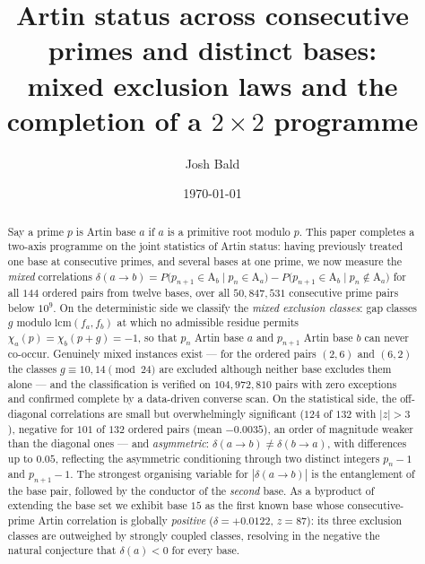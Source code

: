 \documentclass[11pt,reqno]{amsart}
\theoremstyle{plain}
\theoremstyle{definition}
\newcommand{\Art}{\mathrm{A}}
\begin{document}
\title[Mixed correlations of Artin primes]
{Artin status across consecutive primes and distinct bases:\\
mixed exclusion laws and the completion of a $2 \times 2$ programme}

\author{Josh Bald}
\address{Ontario, Canada}


\date{\today}

\begin{abstract}
Say a prime $p$ is Artin base $a$ if $a$ is a primitive root modulo $p$. This
paper completes a two-axis programme on the joint statistics of Artin status:
having previously treated one base at consecutive primes, and several bases at
one prime, we now measure the \emph{mixed} correlations
$\delta(a \to b) = P\bigl(p_{n+1} \in \Art_b \mid p_n \in \Art_a\bigr) -
P\bigl(p_{n+1} \in \Art_b \mid p_n \notin \Art_a\bigr)$ for all $144$ ordered
pairs from twelve bases, over all $50{,}847{,}531$ consecutive prime pairs
below $10^9$. On the deterministic side we classify the \emph{mixed exclusion
classes}: gap classes $g$ modulo $\mathrm{lcm}(f_a, f_b)$ at which no
admissible residue permits $\chi_a(p) = \chi_b(p+g) = -1$, so that $p_n$
Artin base $a$ and $p_{n+1}$ Artin base $b$ can never co-occur. Genuinely
mixed instances exist --- for the ordered pairs $(2, 6)$ and $(6, 2)$ the
classes $g \equiv 10, 14 \pmod{24}$ are excluded although neither base
excludes them alone --- and the classification is verified on
$104{,}972{,}810$ pairs with zero exceptions and confirmed complete by a
data-driven converse scan. On the statistical side, the off-diagonal
correlations are small but overwhelmingly significant ($124$ of $132$ with
$|z| > 3$), negative for $101$ of $132$ ordered pairs (mean $-0.0035$), an
order of magnitude weaker than the diagonal ones --- and \emph{asymmetric}:
$\delta(a \to b) \neq \delta(b \to a)$, with differences up to $0.05$,
reflecting the asymmetric conditioning through two distinct integers
$p_n - 1$ and $p_{n+1} - 1$. The strongest organising variable for
$|\delta(a \to b)|$ is the entanglement of the base pair, followed by the
conductor of the \emph{second} base. As a byproduct of extending the base set
we exhibit base $15$ as the first known base whose consecutive-prime Artin
correlation is globally \emph{positive} ($\delta = +0.0122$, $z = 87$): its
three exclusion classes are outweighed by strongly coupled classes, resolving
in the negative the natural conjecture that $\delta(a) < 0$ for every base.
\end{abstract}
\end{document}
